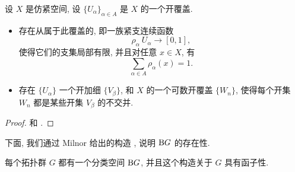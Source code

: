 \begin{fact} \label{thm-1-paracompact}
    设 $X$ 是仿紧空间, 设 $\{ U_\alpha \}_{\alpha \in A}$
    是 $X$ 的一个开覆盖.
    \begin{itemize}
        \item 
            存在从属于此覆盖的,
            即一族紧支连续函数
            \[ \rho_\alpha \: U_\alpha \to [0, 1], \]
            使得它们的支集局部有限, 并且对任意 $x \in X$, 有
            \[ \sum_{\alpha \in A} \rho_\alpha (x) = 1. \]
        \item
            存在 $\{ U_\alpha \}$ 一个开加细 $\{ V_\beta \}$,
            和 $X$ 的一个可数开覆盖 $\{ W_n \}$, 
            使得每个开集 $W_n$ 都是某些开集 $V_\beta$ 的不交并.
    \end{itemize}
\end{fact}

\begin{proof}
    \cite[定理~41.7]{munkres} 和 \cite[引理~5.9]{milnor-stasheff}. 
\end{proof}

下面, 我们通过 Milnor 给出的构造 \cite{milnor}, 说明 $\mathrm{B} G$ 的存在性. 

\begin{theorem}
    每个拓扑群 $G$ 都有一个分类空间 $\mathrm{B} G$, 
    并且这个构造关于 $G$ 具有函子性. 
\end{theorem}

